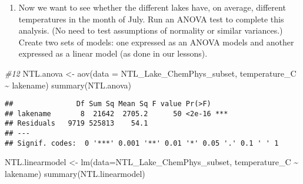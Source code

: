 \documentclass[
]{article}
\newenvironment{Shaded}{\begin{snugshade}}{\end{snugshade}}
\newcommand{\AttributeTok}[1]{\textcolor[rgb]{0.77,0.63,0.00}{#1}}
\newcommand{\CommentTok}[1]{\textcolor[rgb]{0.56,0.35,0.01}{\textit{#1}}}
\newcommand{\FunctionTok}[1]{\textcolor[rgb]{0.00,0.00,0.00}{#1}}
\newcommand{\NormalTok}[1]{#1}
\newcommand{\OtherTok}[1]{\textcolor[rgb]{0.56,0.35,0.01}{#1}}
\newcommand{\SpecialCharTok}[1]{\textcolor[rgb]{0.00,0.00,0.00}{#1}}
\providecommand{\tightlist}{%
  \setlength{\itemsep}{0pt}\setlength{\parskip}{0pt}}
\begin{document}
\begin{enumerate}
\def\labelenumi{\arabic{enumi}.}
\setcounter{enumi}{11}
\tightlist
\item
  Now we want to see whether the different lakes have, on average,
  different temperatures in the month of July. Run an ANOVA test to
  complete this analysis. (No need to test assumptions of normality or
  similar variances.) Create two sets of models: one expressed as an
  ANOVA models and another expressed as a linear model (as done in our
  lessons).
\end{enumerate}

\begin{Shaded}
\begin{Highlighting}[]
\CommentTok{\#12}
\NormalTok{NTL.anova }\OtherTok{\textless{}{-}} \FunctionTok{aov}\NormalTok{(}\AttributeTok{data =}\NormalTok{ NTL\_Lake\_ChemPhys\_subset, temperature\_C }\SpecialCharTok{\textasciitilde{}}\NormalTok{ lakename)}
\FunctionTok{summary}\NormalTok{(NTL.anova)}
\end{Highlighting}
\end{Shaded}

\begin{verbatim}
##               Df Sum Sq Mean Sq F value Pr(>F)    
## lakename       8  21642  2705.2      50 <2e-16 ***
## Residuals   9719 525813    54.1                   
## ---
## Signif. codes:  0 '***' 0.001 '**' 0.01 '*' 0.05 '.' 0.1 ' ' 1
\end{verbatim}

\begin{Shaded}
\begin{Highlighting}[]
\NormalTok{NTL.linearmodel }\OtherTok{\textless{}{-}} \FunctionTok{lm}\NormalTok{(}\AttributeTok{data=}\NormalTok{NTL\_Lake\_ChemPhys\_subset, temperature\_C }\SpecialCharTok{\textasciitilde{}}\NormalTok{ lakename)}
\FunctionTok{summary}\NormalTok{(NTL.linearmodel)}
\end{Highlighting}
\end{Shaded}
\end{document}
